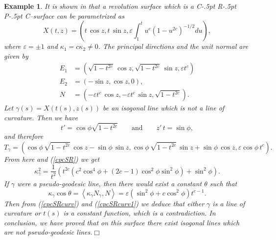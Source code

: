 \documentclass[11pt,a4paper]{article}
\def\e{\varepsilon}
\def\e{\varepsilon}
\def\<{\left<}
\def\>{\right>}
\def\e{\varepsilon}
\def\g{\gamma}
\def\CRPC{C\kern-.5pt R\kern-.5pt P\kern-.5pt C}
\newtheorem{example}{Example}
\begin{document}
\begin{example}\label{ex3}
It is shown in \cite[p. 96]{Kuhnel06} that a revolution surface which is a \CRPC--surface can be parametrized as
\[
X(t,z)=(t\,\cos z,t\,\sin z,\varepsilon \int_1^t u^c(1-u^{2c})^{-1/2}du),
\]
where $\varepsilon=\pm 1$ and $\kappa_1=c\kappa_2\neq 0$.
The principal directions and the unit normal are given by
\begin{align*}
E_1 &= (\sqrt{1-t^{2c}}\,\cos z,\sqrt{1-t^{2c}}\,\sin z,\varepsilon t^c)\\
E_2 &= (-\sin z,\cos z,0),\\
N &=(-\varepsilon t^c\,\cos z,-\varepsilon t^c\,\sin z,\sqrt{1-t^{2c}}).
\end{align*}
Let $\gamma(s)=X(t(s),z(s))$ be an  isogonal line which is not a line of curvature. Then we have
\begin{equation}\label{cpcSR}
t'= \cos\phi\sqrt{1-t^{2c}} \qquad\text{and}\qquad  z'\,t= \sin\phi,
\end{equation}
and therefore
\[
T_\gamma=(\cos\phi\,\sqrt{1-t^{2c}}\,\cos z-\sin\phi\,\sin z,\cos\phi\,\sqrt{1-t^{2c}}\,\sin z+\sin\phi\,\cos z,\varepsilon \cos\phi\,t^c).
\]
From here and (\ref{cpcSR}) we get
\begin{equation}\label{cpcSRcurv}
\kappa^2_\gamma=\frac{1}{t^2}\left(t^{2c}(c^2\cos^4\phi+(2c-1)\cos^2\phi\sin^2\phi)+\sin^2\phi\right).
\end{equation}
If $\gamma$ were a pseudo-geodesic line, then there would exist a constant $\theta$ such that
\begin{equation}\label{cpcSRcurv1}
\kappa_\gamma\cos\theta=\<\kappa_\gamma N_\gamma,N\>=\e(\sin^2\phi+c\cos^2\phi)t^{c-1}.
\end{equation}
Then from (\ref{cpcSRcurv}) and (\ref{cpcSRcurv1}) we deduce that either $\g$ is a line of curvature or $t(s)$ is a constant function, which is a contradiction. In conclusion, we have proved that on this surface there exist isogonal lines which are not pseudo-geodesic lines.\hfill$\Box$
\end{example}
\end{document}

